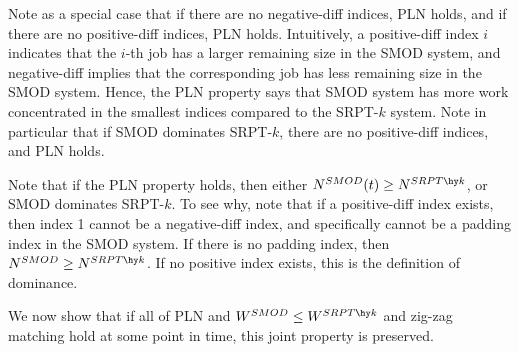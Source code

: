 \documentclass[acmsmall]{acmart}
\begin{document}
Note as a special case that if there are no negative-diff indices, PLN holds,
and if there are no positive-diff indices, PLN holds. 
Intuitively, a positive-diff index $i$ indicates that the $i$-th job has a larger remaining size in the SMOD system, and negative-diff implies that the corresponding job has less remaining size in the SMOD system. Hence, the PLN property says that SMOD system has more work concentrated in the smallest indices compared to the SRPT-$k$ system. Note in particular that if SMOD dominates SRPT-$k$, there are no positive-diff indices, and PLN holds.

Note that if the PLN property holds, then either $N^{SMOD}(t) \ge N^{SRPT\hy k}$, or SMOD dominates SRPT-$k$.
To see why, note that if a positive-diff index exists, then index 1 cannot be a negative-diff index, and specifically cannot be a padding index in the SMOD system.
If there is no padding index, then $N^{SMOD} \ge N^{SRPT\hy k}$.
If no positive index exists, this is the definition of dominance.

We now show that if all of PLN and $W^{SMOD} \le W^{SRPT\hy k}$ and zig-zag matching hold at some point in time, this joint property is preserved.
\end{document}
